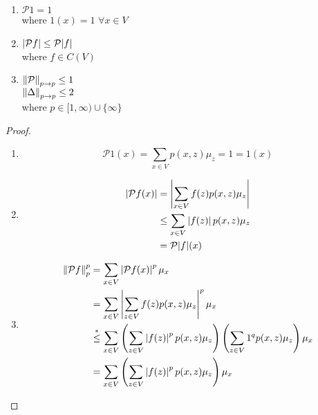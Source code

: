 \documentclass[main]{subfiles}
\begin{document}
\begin{prop}
    \begin{enumerate}
        \item $\mathcal{P}1 = 1$\\
              where $1(x) = 1$ $\forall x \in V$
        \item $\left\lvert\mathcal{P}f\right\rvert \leq \mathcal{P}{\left\lvert f\right\rvert}$\\
              where $f \in C(V)$
        \item
              $\left\lVert\mathcal{P}\right\rVert_{p \to p} \leq 1$\\
              $\left\lVert\Delta\right\rVert_{p \to p} \leq 2$\\
              where $p \in [1, \infty) \cup \{\infty\}$
    \end{enumerate}
    \begin{proof}
        \begin{enumerate}
            \item $$\mathcal{P}1(x) = \sum_{x \in V}p(x,z)\mu_z = 1 = 1(x)$$
            \item
                  \begin{align*}
                      \left\lvert\mathcal{P}f(x)\right\rvert & = \left\lvert\sum_{x \in V}f(z)p(x,z)\mu_z\right\rvert    \\
                                            & \leq \sum_{x \in V}\left\lvert f(z)\right\rvert p(x,z)\mu_z \\
                                            & = \mathcal{P}{\left\lvert f\right\rvert}(x)
                  \end{align*}
            \item
                  \begin{equation}
                      \begin{aligned}
                          \norm{\mathcal{P}f}{p}^p             & = \sum_{x \in V}\Mod{\mathcal{P}f(x)}^p\mu_x                                                                                      \\
                                                               & = \sum_{x \in V}\Mod{\sum_{z \in V}f(z)p(x,z)\mu_z}^p\mu_x                                                                        \\
                                                               & \stackrel{*}{\leq} \sum_{x \in V}\left(\sum_{z \in V}\Mod{f(z)}^pp(x,z)\mu_z\right)\left(\sum_{z \in V}1^qp(x,z)\mu_z\right)\mu_x \\
                                                               & = \sum_{x \in V}\left(\sum_{z \in V}\Mod{f(z)}^pp(x,z)\mu_z\right)\mu_x                                                           \\

\end{aligned}
\end{equation}
\end{enumerate}
\end{proof}
\end{prop}
\end{document}
